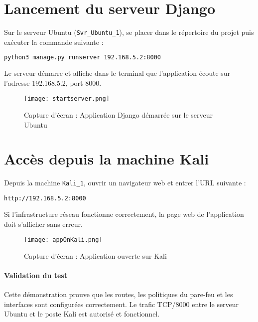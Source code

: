 \documentclass[11pt,a4paper]{report}
\begin{document}
\section{Lancement du serveur Django}
Sur le serveur Ubuntu (\texttt{Svr\_Ubuntu\_1}), se placer dans le répertoire du projet puis exécuter la commande suivante :

\begin{lstlisting}[language=bash,caption={Commande de lancement du serveur Django}]
python3 manage.py runserver 192.168.5.2:8000
\end{lstlisting}

Le serveur démarre et affiche dans le terminal que l'application écoute sur l'adresse 192.168.5.2, port 8000.

\begin{figure}[H]
\centering
\texttt{[image: startserver.png]}
\caption{Capture d'écran : Application Django démarrée sur le serveur Ubuntu}
\label{fig:startserver}
\end{figure}


\section{Accès depuis la machine Kali}
Depuis la machine \texttt{Kali\_1}, ouvrir un navigateur web et entrer l'URL suivante :

\begin{lstlisting}[language=bash]
http://192.168.5.2:8000
\end{lstlisting}

Si l'infrastructure réseau fonctionne correctement, la page web de l'application doit s'afficher sans erreur.

\begin{figure}[H]
\centering
\texttt{[image: appOnKali.png]}
\caption{Capture d'écran : Application ouverte sur Kali}
\label{fig:appOnkali}
\end{figure}

\paragraph{Validation du test}
Cette démonstration prouve que les routes, les politiques du pare-feu et les interfaces sont configurées correctement. Le trafic TCP/8000 entre le serveur Ubuntu et le poste Kali est autorisé et fonctionnel.
\end{document}
